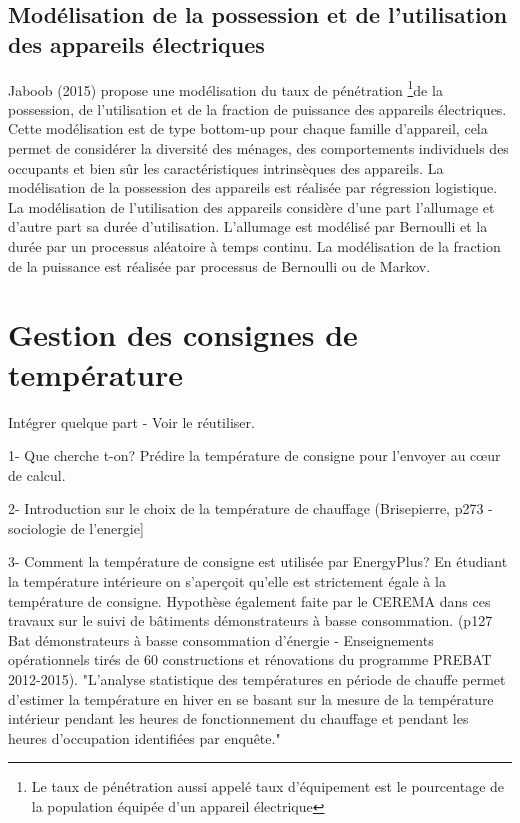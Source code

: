 \subsection{Modélisation de la possession et de l'utilisation des appareils électriques}

Jaboob (2015) propose une modélisation du taux de pénétration \footnote{Le taux de pénétration aussi appelé taux d'équipement est le pourcentage de la population équipée d'un appareil électrique}de la possession, de l'utilisation et de la fraction de puissance des appareils électriques. Cette modélisation est de type bottom-up pour chaque famille d'appareil, cela permet de considérer la diversité des ménages, des comportements individuels des occupants et bien sûr les caractéristiques intrinsèques des appareils. La modélisation de la possession des appareils est réalisée par régression logistique. La modélisation de l'utilisation des appareils considère d'une part l'allumage et d'autre part sa durée d'utilisation. L'allumage est modélisé par Bernoulli et la durée par un processus aléatoire à temps continu. La modélisation de la fraction de la puissance est réalisée par processus de Bernoulli ou de Markov.

\section{Gestion des consignes de température}

Intégrer quelque part \cite{d'Oca-14} - Voir le réutiliser.

1- Que cherche t-on? Prédire la température de consigne pour l'envoyer au cœur de calcul.

2- Introduction sur le choix de la température de chauffage (Brisepierre, p273 - sociologie de l'energie]

3- Comment la température de consigne est utilisée par EnergyPlus? En étudiant la température intérieure on s'aperçoit qu'elle est strictement égale à la température de consigne. Hypothèse également faite par le CEREMA dans ces travaux sur le suivi de bâtiments démonstrateurs à basse consommation. (p127  Bat démonstrateurs à basse consommation d'énergie - Enseignements opérationnels tirés de 60 constructions et rénovations du programme PREBAT 2012-2015). "L'analyse statistique des températures en période de chauffe permet d'estimer la température en hiver en se basant sur la mesure de la température intérieur pendant les heures de fonctionnement du chauffage et pendant les heures d'occupation identifiées par enquête."

